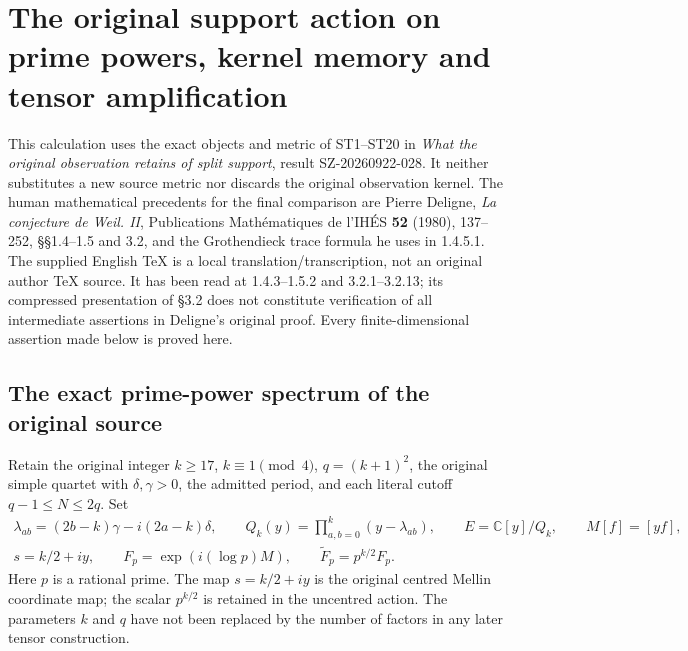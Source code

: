\section{The original support action on prime powers, kernel memory and tensor amplification}
\label{sec:tau-prime-memory}

This calculation uses the exact objects and metric of ST1--ST20 in
\emph{What the original observation retains of split support}, result
SZ-20260922-028. It neither substitutes a new source metric nor discards
the original observation kernel. The human mathematical precedents for
the final comparison are Pierre Deligne, \emph{La conjecture de Weil. II},
Publications Math\'ematiques de l'IH\'ES \textbf{52} (1980), 137--252,
\S\S1.4--1.5 and 3.2, and the Grothendieck trace formula he uses in
1.4.5.1. The supplied English TeX is a local translation/transcription,
not an original author TeX source. It has been read at 1.4.3--1.5.2 and
3.2.1--3.2.13; its compressed presentation of \S3.2 does not constitute
verification of all intermediate assertions in Deligne's original proof.
Every finite-dimensional assertion made below is proved here.

\subsection{The exact prime-power spectrum of the original source}

Retain the original integer $k\ge17$, $k\equiv1\pmod4$, $q=(k+1)^2$,
the original simple quartet with $\delta,\gamma>0$, the admitted period,
and each literal cutoff $q-1\le N\le2q$. Set
\begin{equation}\tag{TDP1}
\begin{gathered}
\lambda_{ab}=(2b-k)\gamma-i(2a-k)\delta,\qquad
Q_k(y)=\prod_{a,b=0}^k(y-\lambda_{ab}),\qquad
E=\mathbb C[y]/Q_k,\qquad M[f]=[yf],\\
s=k/2+iy,\qquad
F_p=\exp(i(\log p)M),\qquad
\widetilde F_p=p^{k/2}F_p .
\end{gathered}
\end{equation}
Here $p$ is a rational prime. The map $s=k/2+iy$ is the original
centred Mellin coordinate map; the scalar $p^{k/2}$ is retained in the
uncentred action. The parameters $k$ and $q$ have not been replaced by
the number of factors in any later tensor construction.

